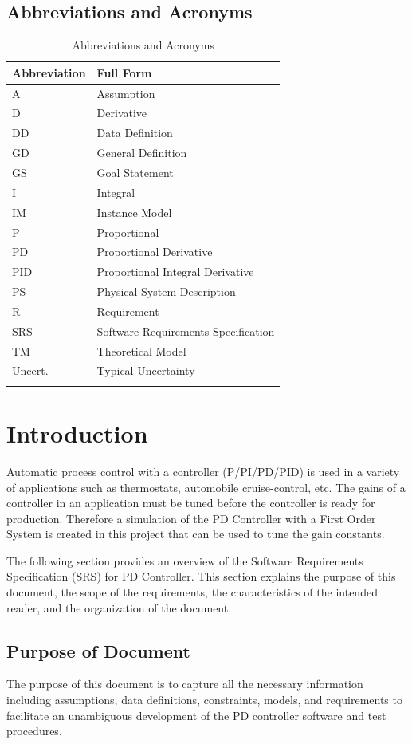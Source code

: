 \documentclass[12pt]{article}
\begin{document}
\subsection{Abbreviations and Acronyms}
\label{Sec:TAbbAcc}
\begin{longtable}{l l}
\toprule
\textbf{Abbreviation} & \textbf{Full Form}
\\
\midrule
\endhead
A & Assumption
\\
D & Derivative
\\
DD & Data Definition
\\
GD & General Definition
\\
GS & Goal Statement
\\
I & Integral
\\
IM & Instance Model
\\
P & Proportional
\\
PD & Proportional Derivative
\\
PID & Proportional Integral Derivative
\\
PS & Physical System Description
\\
R & Requirement
\\
SRS & Software Requirements Specification
\\
TM & Theoretical Model
\\
Uncert. & Typical Uncertainty
\\
\bottomrule
\caption{Abbreviations and Acronyms}
\label{Table:TAbbAcc}
\end{longtable}
\section{Introduction}
\label{Sec:Intro}
Automatic process control with a controller (P/PI/PD/PID) is used  in a variety of applications such as thermostats, automobile  cruise-control, etc. The gains of a controller in an application  must be tuned before the controller is ready for production. Therefore a simulation of the  PD Controller  with a  First Order System is created in this project that can be  used to tune the gain constants.

The following section provides an overview of the Software Requirements Specification (SRS) for PD Controller. This section explains the purpose of this document, the scope of the requirements, the characteristics of the intended reader, and the organization of the document.

\subsection{Purpose of Document}
\label{Sec:DocPurpose}
The purpose of this document is to capture all the necessary  information including assumptions, data definitions, constraints,  models, and requirements to facilitate an unambiguous development  of the PD controller software and test procedures.
\end{document}
